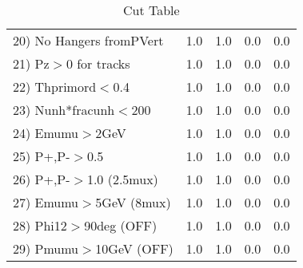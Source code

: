 \begin{table}[h!]
\begin{tabular}{||l||r|r|r|r||}
 20) No Hangers fromPVert &         1.0 &         1.0 &         0.0 &         0.0 \\
 21) Pz$>$0 for tracks    &         1.0 &         1.0 &         0.0 &         0.0 \\
 22) Thprimord$<$0.4      &         1.0 &         1.0 &         0.0 &         0.0 \\
 23) Nunh*fracunh$<$200   &         1.0 &         1.0 &         0.0 &         0.0 \\
 24) Emumu$>$2GeV         &         1.0 &         1.0 &         0.0 &         0.0 \\
 25) P+,P-$>$0.5          &         1.0 &         1.0 &         0.0 &         0.0 \\
 26) P+,P-$>$1.0 (2.5mux) &         1.0 &         1.0 &         0.0 &         0.0 \\
 27) Emumu$>$5GeV  (8mux) &         1.0 &         1.0 &         0.0 &         0.0 \\
 28) Phi12$>$90deg  (OFF) &         1.0 &         1.0 &         0.0 &         0.0 \\
 29) Pmumu$>$10GeV  (OFF) &         1.0 &         1.0 &         0.0 &         0.0 \\
 \hline
 \hline
 \end{tabular}
 \caption{Cut Table \cohpip }
 \label{tab-cut_copip}
 \end{table}
